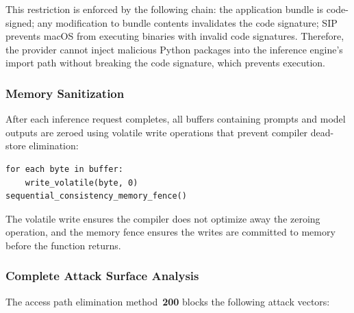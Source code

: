 \documentclass[11pt,letterpaper]{article}
\begin{document}
This restriction is enforced by the following chain: the application bundle is code-signed; any modification to bundle contents invalidates the code signature; SIP prevents macOS from executing binaries with invalid code signatures. Therefore, the provider cannot inject malicious Python packages into the inference engine's import path without breaking the code signature, which prevents execution.

\subsubsection{Memory Sanitization}

After each inference request completes, all buffers containing prompts and model outputs are zeroed using volatile write operations that prevent compiler dead-store elimination:
\begin{lstlisting}
for each byte in buffer:
    write_volatile(byte, 0)
sequential_consistency_memory_fence()
\end{lstlisting}

The volatile write ensures the compiler does not optimize away the zeroing operation, and the memory fence ensures the writes are committed to memory before the function returns.

\subsubsection{Complete Attack Surface Analysis}

The access path elimination method~\textbf{200} blocks the following attack vectors:
\end{document}
